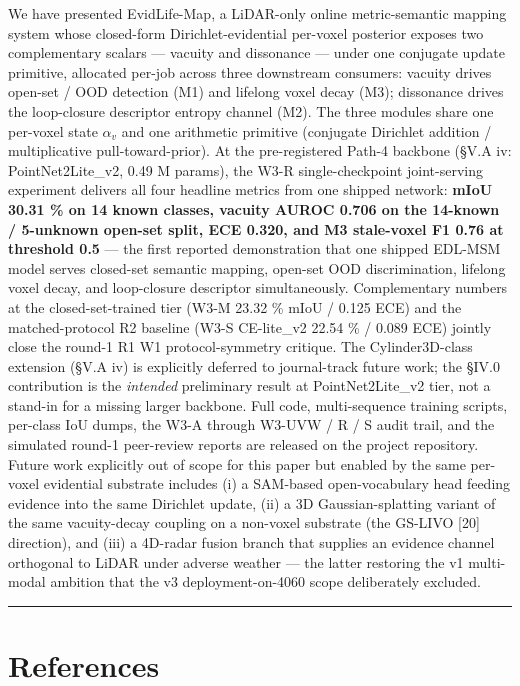 \documentclass[
]{article}
\begin{document}
We have presented EvidLife-Map, a LiDAR-only online metric-semantic
mapping system whose closed-form Dirichlet-evidential per-voxel
posterior exposes two complementary scalars --- vacuity and dissonance
--- under one conjugate update primitive, allocated per-job across three
downstream consumers: vacuity drives open-set / OOD detection (M1) and
lifelong voxel decay (M3); dissonance drives the loop-closure descriptor
entropy channel (M2). The three modules share one per-voxel state
\(\alpha_v\) and one arithmetic primitive (conjugate Dirichlet addition
/ multiplicative pull-toward-prior). At the pre-registered Path-4
backbone (§V.A iv: PointNet2Lite\_v2, 0.49 M params), the W3-R
single-checkpoint joint-serving experiment delivers all four headline
metrics from one shipped network: \textbf{mIoU 30.31 \% on 14 known
classes, vacuity AUROC 0.706 on the 14-known / 5-unknown open-set split,
ECE 0.320, and M3 stale-voxel F1 0.76 at threshold 0.5} --- the first
reported demonstration that one shipped EDL-MSM model serves closed-set
semantic mapping, open-set OOD discrimination, lifelong voxel decay, and
loop-closure descriptor simultaneously. Complementary numbers at the
closed-set-trained tier (W3-M 23.32 \% mIoU / 0.125 ECE) and the
matched-protocol R2 baseline (W3-S CE-lite\_v2 22.54 \% / 0.089 ECE)
jointly close the round-1 R1 W1 protocol-symmetry critique. The
Cylinder3D-class extension (§V.A iv) is explicitly deferred to
journal-track future work; the §IV.0 contribution is the \emph{intended}
preliminary result at PointNet2Lite\_v2 tier, not a stand-in for a
missing larger backbone. Full code, multi-sequence training scripts,
per-class IoU dumps, the W3-A through W3-UVW / R / S audit trail, and
the simulated round-1 peer-review reports are released on the project
repository. Future work explicitly out of scope for this paper but
enabled by the same per-voxel evidential substrate includes (i) a
SAM-based open-vocabulary head feeding evidence into the same Dirichlet
update, (ii) a 3D Gaussian-splatting variant of the same vacuity-decay
coupling on a non-voxel substrate (the GS-LIVO {[}20{]} direction), and
(iii) a 4D-radar fusion branch that supplies an evidence channel
orthogonal to LiDAR under adverse weather --- the latter restoring the
v1 multi-modal ambition that the v3 deployment-on-4060 scope
deliberately excluded.

\begin{center}\rule{0.5\linewidth}{0.5pt}\end{center}

\section{References}\label{references}
\end{document}
